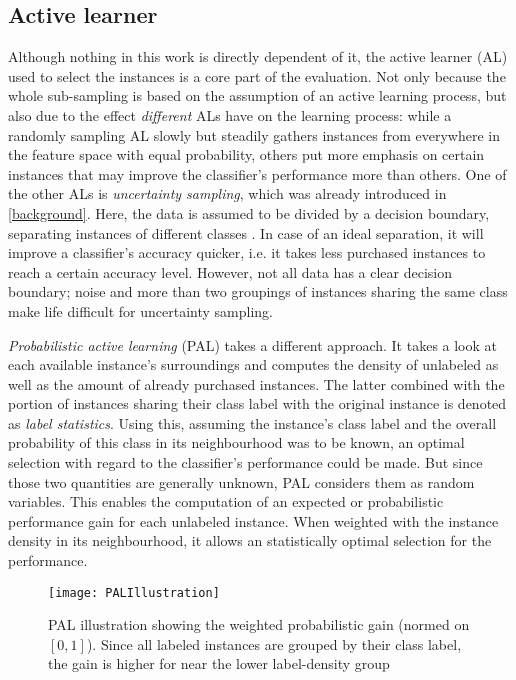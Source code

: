 \subsection{Active learner}

Although nothing in this work is directly dependent of it, the active learner (AL) used to select the instances is a core part of the evaluation. Not only because the whole sub-sampling is based on the assumption of an active learning process, but also due to the effect \textit{different} ALs have on the learning process: while a randomly sampling AL slowly but steadily gathers instances from everywhere in the feature space with equal probability, others put more emphasis on certain instances that may improve the classifier's performance more than others. One of the other ALs is \textit{uncertainty sampling}, which was already introduced in \ref{background}. Here, the data is assumed to be divided by a decision boundary, separating instances of different classes \cite{ZhuEtAl2008}. In case of an ideal separation, it will improve a classifier's accuracy quicker, i.e. it takes less purchased instances to reach a certain accuracy level. However, not all data has a clear decision boundary; noise and more than two groupings of instances sharing the same class make life difficult for uncertainty sampling.

\textit{Probabilistic active learning} (PAL) takes a different approach. It takes a look at each available instance's surroundings and computes the density of unlabeled as well as the amount of already purchased instances. The latter combined with the portion of instances sharing their class label with the original instance is denoted as \textit{label statistics}. Using this, assuming the instance's class label and the overall probability of this class in its neighbourhood was to be known, an optimal selection with regard to the classifier's performance could be made. But since those two quantities are generally unknown, PAL considers them as random variables. This enables the computation of an expected or probabilistic performance gain for each unlabeled instance. When weighted with the instance density in its neighbourhood, it allows an statistically optimal selection for the performance.

\begin{figure}[h]
	\centering
	\texttt{[image: PALIllustration]}
	\caption{PAL illustration showing the weighted probabilistic gain (normed on $[0, 1]$). Since all labeled instances are grouped by their class label, the gain is higher for near the lower label-density group}
	\label{fig:PALIllustration}
\end{figure}

